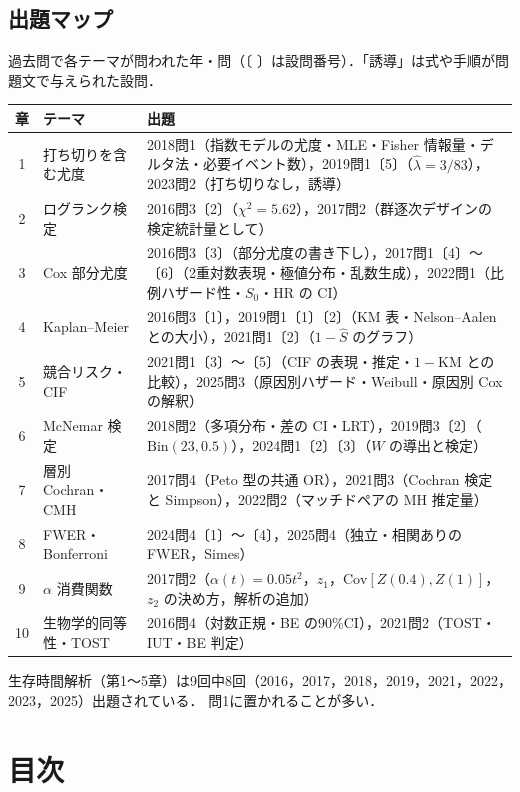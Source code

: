 \documentclass[a4paper,11pt,openany]{ltjsbook}
\newcommand{\Cov}{\mathrm{Cov}}
\newcommand{\Bin}{\mathrm{Bin}}
\begin{document}
\section*{出題マップ}
過去問で各テーマが問われた年・問（〔 〕は設問番号）．「誘導」は式や手順が問題文で与えられた設問．
\begin{center}\small
\begin{tabular}{@{}clL{100mm}@{}}
\toprule
章 & テーマ & 出題\\
 & 打ち切りを含む尤度 & 2018問1（指数モデルの尤度・MLE・Fisher 情報量・デルタ法・必要イベント数），2019問1〔5〕（$\hat\lambda=3/83$），2023問2（打ち切りなし，誘導）\\
2 & ログランク検定 & 2016問3〔2〕（$\chi^2=5.62$），2017問2（群逐次デザインの検定統計量として）\\
3 & Cox 部分尤度 & 2016問3〔3〕（部分尤度の書き下し），2017問1〔4〕〜〔6〕（2重対数表現・極値分布・乱数生成），2022問1（比例ハザード性・$S_0$・HR の CI）\\
4 & Kaplan--Meier & 2016問3〔1〕，2019問1〔1〕〔2〕（KM 表・Nelson--Aalen との大小），2021問1〔2〕（$1-\hat S$ のグラフ）\\
5 & 競合リスク・CIF & 2021問1〔3〕〜〔5〕（CIF の表現・推定・$1-\mathrm{KM}$ との比較），2025問3（原因別ハザード・Weibull・原因別 Cox の解釈）\\
6 & McNemar 検定 & 2018問2（多項分布・差の CI・LRT），2019問3〔2〕（$\Bin(23,0.5)$），2024問1〔2〕〔3〕（$W$ の導出と検定）\\
7 & 層別 Cochran・CMH & 2017問4（Peto 型の共通 OR），2021問3（Cochran 検定と Simpson），2022問2（マッチドペアの MH 推定量）\\
8 & FWER・Bonferroni & 2024問4〔1〕〜〔4〕，2025問4（独立・相関ありの FWER，Simes）\\
9 & $\alpha$ 消費関数 & 2017問2（$\alpha(t)=0.05t^2$，$z_1$，$\Cov[Z(0.4),Z(1)]$，$z_2$ の決め方，解析の追加）\\
10 & 生物学的同等性・TOST & 2016問4（対数正規・BE の90\%CI），2021問2（TOST・IUT・BE 判定）\\
\bottomrule
\end{tabular}
\end{center}
生存時間解析（第1〜5章）は9回中8回（2016，2017，2018，2019，2021，2022，2023，2025）出題されている．
問1に置かれることが多い．

\chapter*{目次}
\begin{multicols}{2}\footnotesize\sloppy
\makeatletter{}\makeatother
\end{multicols}
\end{document}
